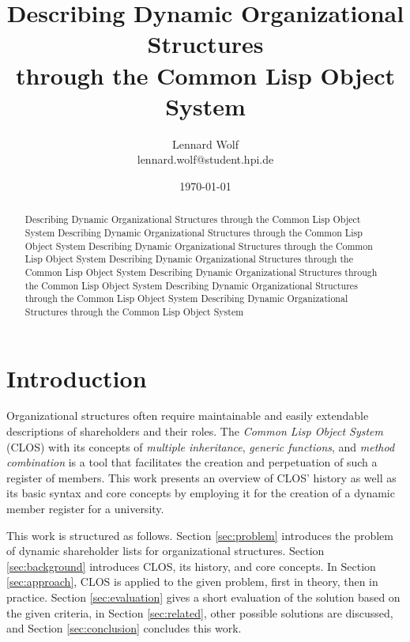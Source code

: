 \documentclass[oribibl]{llncs}
\author{Lennard Wolf \\
        lennard.wolf@student.hpi.de}
\institute{ Hasso Plattner Institute \\
            Prof.-Dr.-Helmert-Straße 2-3 \\
            14482 Potsdam \\
            Germany}
\title{Describing Dynamic Organizational Structures \\
 through the Common Lisp Object System}
\date{\today}
\begin{document}
\thispagestyle{empty}
\vfill

%
\maketitle
%
\begin{abstract}
Describing Dynamic Organizational Structures through the Common Lisp Object System Describing Dynamic Organizational Structures through the Common Lisp Object System Describing Dynamic Organizational Structures through the Common Lisp Object System Describing Dynamic Organizational Structures through the Common Lisp Object System Describing Dynamic Organizational Structures through the Common Lisp Object System Describing Dynamic Organizational Structures through the Common Lisp Object System Describing Dynamic Organizational Structures through the Common Lisp Object System
\end{abstract}
%


\section{Introduction}

Organizational structures often require maintainable and easily extendable descriptions of shareholders and their roles. The \emph{Common Lisp Object System} (CLOS) with its concepts of \emph{multiple inheritance}, \emph{generic functions}, and \emph{method combination} is a tool that facilitates the creation and perpetuation of such a register of members. This work presents an overview of CLOS' history as well as its basic syntax and core concepts by employing it for the creation of a dynamic member register for a university. 
\newline

This work is structured as follows. Section \ref{sec:problem} introduces the problem of dynamic shareholder lists for organizational structures. Section \ref{sec:background} introduces CLOS, its history, and core concepts. In Section \ref{sec:approach}, CLOS is applied to the given problem, first in theory, then in practice. Section \ref{sec:evaluation} gives a short evaluation of the solution based on the given criteria, in Section \ref{sec:related}, other possible solutions are discussed, and Section \ref{sec:conclusion} concludes this work.
\end{document}

